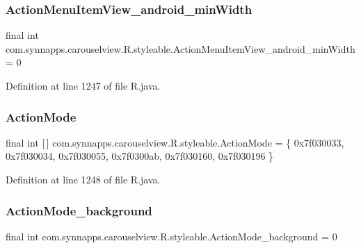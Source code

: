\subsubsection{\texorpdfstring{ActionMenuItemView\_android\_minWidth}{ActionMenuItemView\_android\_minWidth}}
{\footnotesize\ttfamily final int com.\+synnapps.\+carouselview.\+R.\+styleable.\+Action\+Menu\+Item\+View\+\_\+android\+\_\+min\+Width = 0\hspace{0.3cm}{\ttfamily [static]}}



Definition at line 1247 of file R.\+java.

\mbox{\label{classcom_1_1synnapps_1_1carouselview_1_1_r_1_1styleable_accfc47a6653399dfdd93b47eeb7d8d06}} 
\subsubsection{\texorpdfstring{ActionMode}{ActionMode}}
{\footnotesize\ttfamily final int \mbox{[}$\,$\mbox{]} com.\+synnapps.\+carouselview.\+R.\+styleable.\+Action\+Mode = \{ 0x7f030033, 0x7f030034, 0x7f030055, 0x7f0300ab, 0x7f030160, 0x7f030196 \}\hspace{0.3cm}{\ttfamily [static]}}



Definition at line 1248 of file R.\+java.

\mbox{\label{classcom_1_1synnapps_1_1carouselview_1_1_r_1_1styleable_af39bc99a3d42d6b70cb8562707702782}} 
\subsubsection{\texorpdfstring{ActionMode\_background}{ActionMode\_background}}
{\footnotesize\ttfamily final int com.\+synnapps.\+carouselview.\+R.\+styleable.\+Action\+Mode\+\_\+background = 0\hspace{0.3cm}{\ttfamily [static]}}




